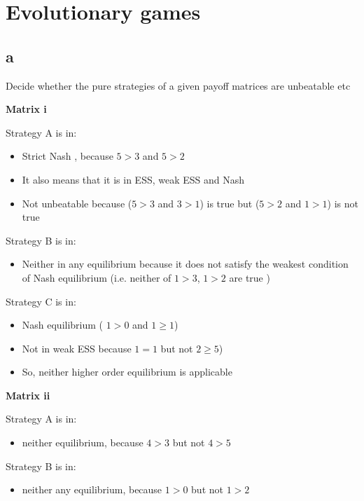 \newcommand{\package}{\emph}

\setcounter{chapter}{1}
\setcounter{section}{0}
\section{Evolutionary games}

\subsection{a}

Decide whether the pure strategies of a given payoff matrices are unbeatable etc

\textbf{Matrix i}

Strategy A is in:
\begin{itemize}
\item Strict Nash , because $5>3$ and $5>2$ 
\item It also means that it is in ESS, weak ESS and Nash
\item Not unbeatable because ($5>3$ and $3>1$) is true but ($5>2$ and $1>1$) is not true
\end{itemize}

Strategy B is in:
\begin{itemize}
\item Neither in any equilibrium because it does not satisfy the weakest condition of Nash equilibrium (i.e. neither of $1>3$, $1>2$ are true )
\end{itemize}

Strategy C is in:
\begin{itemize}
\item Nash equilibrium ( $1>0$ and $1\geq 1$)
\item Not in weak ESS because $1=1$ but not $2\geq 5$)
\item So, neither higher order equilibrium is applicable
\end{itemize}

\textbf{Matrix ii}

Strategy A is in:
\begin{itemize}
\item neither equilibrium, because $4>3$ but not $4>5$
\end{itemize}

Strategy B is in:
\begin{itemize}
\item neither any equilibrium, because  $1>0$ but not $1>2$ 
\end{itemize}

